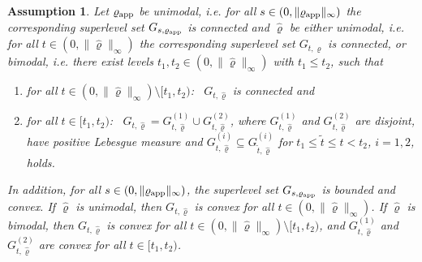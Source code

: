 \documentclass[sn-mathphys-num]{sn-jnl}%
\theoremstyle{thmstyleone}%
\theoremstyle{thmstyletwo}%
\theoremstyle{thmstylethree}%
\newtheorem{assumption}{Assumption}%
\newcommand{\rhoapp}{\varrho_{{\rm app}}}
\newcommand{\change}[1]{\bgroup\color{black}#1\egroup}    %
\begin{document}
\begin{assumption}\label{assum:bimodal}
   Let $\rhoapp$ be unimodal, i.e. for all $s\in(0,\|\rhoapp\|_\infty)$ the corresponding superlevel set $G_{s,\rhoapp}$ is connected and $\widehat{\varrho}$ be either unimodal, i.e. for all $t\in(0,\|\widehat{\varrho}\|_\infty)$ the corresponding superlevel set $G_{t,\widehat{\varrho}}$ is connected, or bimodal, i.e. there exist levels $t_1, t_2\in(0,\|\widehat{\varrho}\|_\infty)$ with $t_1\leq t_2$, such that
   \begin{enumerate}
       
       \item for all $t\in(0,\|\widehat{\varrho}\|_\infty)\setminus[t_1,t_2)$: \, $G_{t,\widehat{\varrho}}$ is connected and   

       \item for all $t\in [t_1,t_2)$: \, $G_{t,\widehat{\varrho}}=G^{(1)}_{t,\widehat{\varrho}}\cup G^{(2)}_{t,\widehat{\varrho}}$, where $G^{(1)}_{t,\widehat{\varrho}}$ and $G^{(2)}_{t,\widehat{\varrho}}$ are disjoint, have positive Lebesgue measure and $G^{(i)}_{t,\widehat{\varrho}}\subseteq G^{(i)}_{\tilde{t},\widehat{\varrho}}$ for $t_1\leq\tilde{t}\leq t<t_2$, $i=1,2$, holds.     
       
   \end{enumerate}
   \change{In addition, for all $s\in(0,\|\rhoapp\|_\infty)$, the superlevel set $G_{s,\rhoapp}$ is bounded and convex. If $\widehat{\varrho}$ is unimodal, then $G_{t,\widehat{\varrho}}$ is convex for all $t\in(0,\|\widehat{\varrho}\|_\infty)$. If $\widehat{\varrho}$ is bimodal, then $G_{t,\widehat{\varrho}}$ is convex for all $t\in(0,\|\widehat{\varrho}\|_\infty)\setminus[t_1,t_2)$, and $G^{(1)}_{t,\widehat{\varrho}}$ and $G^{(2)}_{t,\widehat{\varrho}}$ are convex for all $t\in[t_1,t_2)$.}
\end{assumption}
\end{document}
